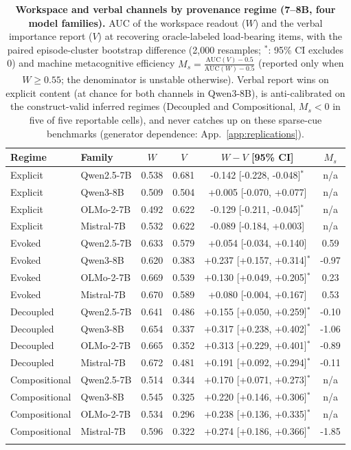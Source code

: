 \begin{table}[t]
\centering
\caption{\textbf{Workspace and verbal channels by provenance regime (7--8B, four model families).} AUC of the workspace
readout ($W$) and the verbal importance report ($V$) at recovering oracle-labeled
load-bearing items, with the paired episode-cluster bootstrap difference (2{,}000 resamples; $^{*}$:
95\% CI excludes 0) and machine metacognitive efficiency
$M_s{=}\frac{\mathrm{AUC}(V)-0.5}{\mathrm{AUC}(W)-0.5}$ (reported only when $W \ge 0.55$; the denominator is unstable otherwise).
Verbal report wins on explicit content (at chance for both channels in Qwen3-8B), is anti-calibrated on the
construct-valid inferred regimes (Decoupled and Compositional, $M_s<0$ in five
of five reportable cells), and never catches up on these sparse-cue benchmarks (generator dependence: App.~\ref{app:replications}).}
\label{tab:master}
\small
\begin{tabular}{llcccc}
\toprule
Regime & Family & $W$ & $V$ & $W-V$ [95\% CI] & $M_s$ \\
\midrule
Explicit & Qwen2.5-7B & 0.538 & 0.681 & -0.142 [-0.228, -0.048]$^{*}$ & n/a \\
Explicit & Qwen3-8B & 0.509 & 0.504 & +0.005 [-0.070, +0.077] & n/a \\
Explicit & OLMo-2-7B & 0.492 & 0.622 & -0.129 [-0.211, -0.045]$^{*}$ & n/a \\
Explicit & Mistral-7B & 0.532 & 0.622 & -0.089 [-0.184, +0.003] & n/a \\
\addlinespace
Evoked & Qwen2.5-7B & 0.633 & 0.579 & +0.054 [-0.034, +0.140] & 0.59 \\
Evoked & Qwen3-8B & 0.620 & 0.383 & +0.237 [+0.157, +0.314]$^{*}$ & -0.97 \\
Evoked & OLMo-2-7B & 0.669 & 0.539 & +0.130 [+0.049, +0.205]$^{*}$ & 0.23 \\
Evoked & Mistral-7B & 0.670 & 0.589 & +0.080 [-0.004, +0.167] & 0.53 \\
\addlinespace
Decoupled & Qwen2.5-7B & 0.641 & 0.486 & +0.155 [+0.050, +0.259]$^{*}$ & -0.10 \\
Decoupled & Qwen3-8B & 0.654 & 0.337 & +0.317 [+0.238, +0.402]$^{*}$ & -1.06 \\
Decoupled & OLMo-2-7B & 0.665 & 0.352 & +0.313 [+0.229, +0.401]$^{*}$ & -0.89 \\
Decoupled & Mistral-7B & 0.672 & 0.481 & +0.191 [+0.092, +0.294]$^{*}$ & -0.11 \\
\addlinespace
Compositional & Qwen2.5-7B & 0.514 & 0.344 & +0.170 [+0.071, +0.273]$^{*}$ & n/a \\
Compositional & Qwen3-8B & 0.545 & 0.325 & +0.220 [+0.146, +0.306]$^{*}$ & n/a \\
Compositional & OLMo-2-7B & 0.534 & 0.296 & +0.238 [+0.136, +0.335]$^{*}$ & n/a \\
Compositional & Mistral-7B & 0.596 & 0.322 & +0.274 [+0.186, +0.366]$^{*}$ & -1.85 \\
\addlinespace
\bottomrule
\end{tabular}
\end{table}
